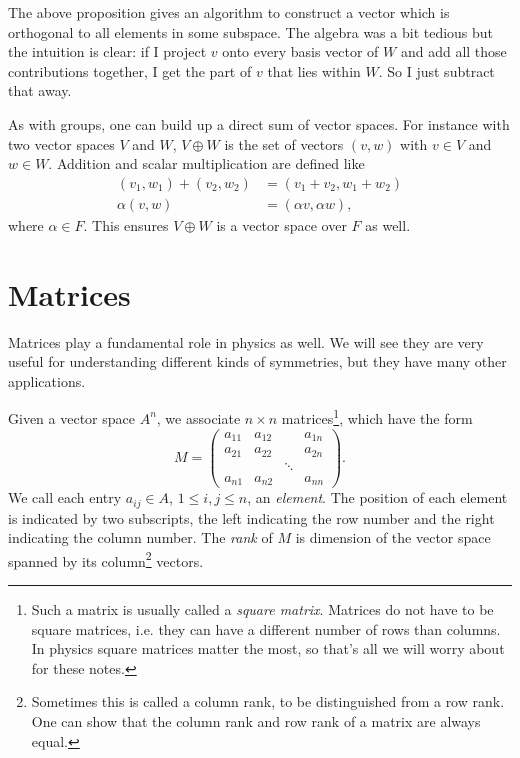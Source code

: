 The above proposition gives an algorithm to construct
a vector which is orthogonal to all elements in some subspace.
The algebra was a bit tedious but the intuition is clear:
if I project $v$ onto every basis vector of $W$ and add all
those contributions together, I get the part of $v$ that lies
within $W$. So I just subtract that away.

As with groups, one can build up a direct sum
of vector spaces. For instance with two vector spaces $V$ and $W$,
$V\oplus W$ is the set of vectors $(v,w)$ with $v\in V$ and $w\in W$.
Addition and scalar multiplication are defined like
\begin{equation}\begin{aligned}
(v_1,w_1)+(v_2,w_2)&=(v_1+v_2,w_1+w_2)\\
\alpha(v,w)&=(\alpha v,\alpha w),
\end{aligned}\end{equation}
where $\alpha\in F$. This ensures $V\oplus W$ is a vector space
over $F$ as well.

\section{Matrices}

Matrices play a fundamental role in physics as well.
We will see they are very useful for understanding different kinds of
symmetries, but they have many other applications.

Given a vector space $A^n$, we associate
$n\times n$ matrices\footnote{Such a matrix is usually called a {\it square
matrix}. Matrices do not have to be square matrices, i.e. they can have a
different number of rows than columns. In physics square
matrices matter the most, so that's all we will worry about for these notes.},
which have the form
\begin{equation}\label{eq:basicMatrix}
  M=\left(\begin{array}{cccc}
          a_{11}   & a_{12} &       & a_{1n}\\
          a_{21}   & a_{22} &       & a_{2n}\\
                   &        & \ddots&       \\
          a_{n1}   & a_{n2} &       & a_{nn}
            \end{array}\right). 
\end{equation}
We call each entry $a_{ij}\in A$, $1\leq i,j\leq n$, an {\it element}. The position
of each element is indicated by two subscripts, the left
indicating the row number and the right indicating the column number.
The {\it rank} of $M$ is dimension of the vector space spanned
by its column\footnote{Sometimes this is called a column rank, to be
distinguished from a row rank. One can show that the column rank and row rank of
a matrix are always equal.} vectors. 

